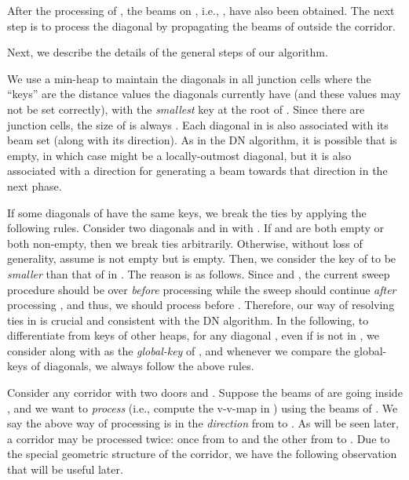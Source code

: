 \documentclass[english,runningheads,11pt]{llncs-revised}
\begin{document}
After the processing of , the beams on , i.e.,
, have also been obtained.
The next step is to process the diagonal  by propagating the
beams of  outside the corridor.



Next, we describe the details of the general steps of our algorithm.

We use a min-heap  to maintain the diagonals in all junction cells where the ``keys'' are the distance values the diagonals currently have (and these values may not be set correctly), with the {\em smallest} key at the root of .  Since there are  junction cells, the size of  is always .
Each diagonal  in  is also associated with its beam set
 (along with its direction).
As in the DN algorithm, it is possible that  is empty,
in which case  might be a locally-outmost
diagonal, but it is also associated with a
direction for generating a beam towards that direction  in the next phase.



If some diagonals of  have the same
keys, we break the ties by applying the following rules. Consider
two diagonals  and  in  with . If
 and  are both empty or both non-empty, then we break ties
arbitrarily. Otherwise, without loss of generality, assume  is
not empty but  is empty. Then, we consider the key of  to be {\em smaller}
than that of  in .
The reason is as follows. Since  and ,
the current sweep procedure should be over {\em before}
processing  while the sweep
should continue {\em after} processing , and thus, we
should process  before .  Therefore,
our way of resolving ties in  is crucial and consistent with the DN algorithm.
In the following, to differentiate from keys of other heaps, for any diagonal , even if  is not in , we consider  along with  as the {\em global-key} of , and whenever we compare the global-keys of diagonals, we always follow the above rules.


Consider any corridor  with two doors  and . Suppose
the beams of  are going inside , and we want to
{\em process}  (i.e., compute the v-v-map in ) using the beams of .
We say the above way of processing  is in the {\em direction} from
 to . As will be seen later,
a corridor may be processed twice: once
from  to  and the other from  to . Due
to the special geometric structure of the corridor, we have the
following observation that will be useful later.
\end{document}
